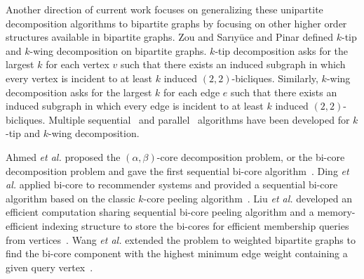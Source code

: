 Another direction of current work focuses on generalizing these unipartite decomposition algorithms to bipartite graphs by focusing on other higher order structures available in bipartite graphs. Zou \cite{ZouZhao16} and Sar\i{}y\"{u}ce and Pinar \cite{SaPi18} defined $k$-tip and $k$-wing decomposition on bipartite graphs. $k$-tip 
decomposition asks for the largest $k$ for each vertex $v$ such that there exists an induced subgraph in which every vertex is incident to at least $k$ induced $(2,2)$-bicliques.
Similarly, $k$-wing decomposition asks for the largest $k$ for each edge $e$ such that there exists an induced subgraph in which every edge is incident to at least $k$ induced $(2,2)$-bicliques. Multiple sequential~\cite{Sanei-MehriST18,ZouZhao16,SaPi18,Wang2012,WaKai20,WangLin21} and parallel~\cite{ShiShun20,TopDown} algorithms have been developed for $k$-tip and $k$-wing decomposition.

Ahmed \textit{et al.} proposed the $(\alpha,\beta)$-core decomposition problem, or the bi-core decomposition problem and gave the first sequential bi-core algorithm~\cite{AhmedBat07}. Ding \textit{et al.} applied bi-core to recommender systems and provided a sequential bi-core algorithm based on the classic $k$-core peeling algorithm~\cite{DingLi17}. Liu \textit{et al.} developed an efficient computation sharing sequential bi-core peeling algorithm and a memory-efficient indexing structure to store the bi-cores for efficient membership queries from vertices~\cite{Liu2020Efficient}. Wang \textit{et al.} extended the problem to weighted bipartite graphs to find the bi-core component with the highest minimum edge weight containing a given query vertex~\cite{WangZhang20}. 

 
